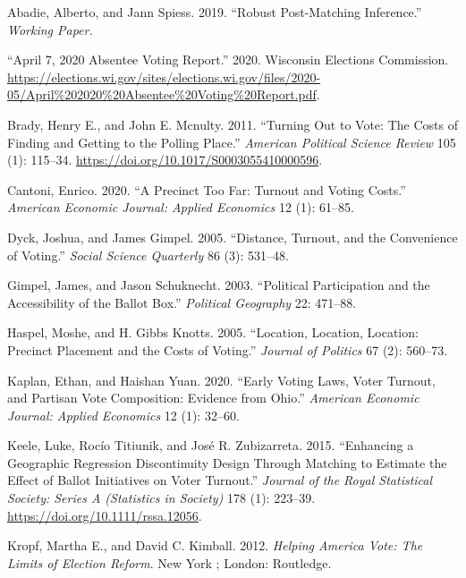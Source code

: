 \documentclass[
  12pt,
]{article}
\newlength{\cslhangindent}
\newenvironment{cslreferences}%
  {\setlength{\parindent}{0pt}%
  \everypar{\setlength{\hangindent}{\cslhangindent}}\ignorespaces}%
  {\par}
\begin{document}
\hypertarget{refs}{}
\begin{cslreferences}
\leavevmode\hypertarget{ref-Abadie2019}{}%
Abadie, Alberto, and Jann Spiess. 2019. ``Robust Post-Matching Inference.'' \emph{Working Paper.}

\leavevmode\hypertarget{ref-wec2020}{}%
``April 7, 2020 Absentee Voting Report.'' 2020. Wisconsin Elections Commission. \url{https://elections.wi.gov/sites/elections.wi.gov/files/2020-05/April\%202020\%20Absentee\%20Voting\%20Report.pdf}.

\leavevmode\hypertarget{ref-Brady2011}{}%
Brady, Henry E., and John E. Mcnulty. 2011. ``Turning Out to Vote: The Costs of Finding and Getting to the Polling Place.'' \emph{American Political Science Review} 105 (1): 115--34. \url{https://doi.org/10.1017/S0003055410000596}.

\leavevmode\hypertarget{ref-Cantoni2020}{}%
Cantoni, Enrico. 2020. ``A Precinct Too Far: Turnout and Voting Costs.'' \emph{American Economic Journal: Applied Economics} 12 (1): 61--85.

\leavevmode\hypertarget{ref-Dyck2005}{}%
Dyck, Joshua, and James Gimpel. 2005. ``Distance, Turnout, and the Convenience of Voting.'' \emph{Social Science Quarterly} 86 (3): 531--48.

\leavevmode\hypertarget{ref-Gimpel2003}{}%
Gimpel, James, and Jason Schuknecht. 2003. ``Political Participation and the Accessibility of the Ballot Box.'' \emph{Political Geography} 22: 471--88.

\leavevmode\hypertarget{ref-Haspel2005}{}%
Haspel, Moshe, and H. Gibbs Knotts. 2005. ``Location, Location, Location: Precinct Placement and the Costs of Voting.'' \emph{Journal of Politics} 67 (2): 560--73.

\leavevmode\hypertarget{ref-Kaplan2020}{}%
Kaplan, Ethan, and Haishan Yuan. 2020. ``Early Voting Laws, Voter Turnout, and Partisan Vote Composition: Evidence from Ohio.'' \emph{American Economic Journal: Applied Economics} 12 (1): 32--60.

\leavevmode\hypertarget{ref-Keele2015}{}%
Keele, Luke, Rocío Titiunik, and José R. Zubizarreta. 2015. ``Enhancing a Geographic Regression Discontinuity Design Through Matching to Estimate the Effect of Ballot Initiatives on Voter Turnout.'' \emph{Journal of the Royal Statistical Society: Series A (Statistics in Society)} 178 (1): 223--39. \url{https://doi.org/10.1111/rssa.12056}.

\leavevmode\hypertarget{ref-Kropf2012}{}%
Kropf, Martha E., and David C. Kimball. 2012. \emph{Helping America Vote: The Limits of Election Reform}. New York ; London: Routledge.


\end{cslreferences}
\end{document}
